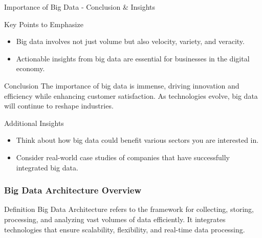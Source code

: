 \documentclass[aspectratio=169]{beamer}
\begin{document}
\begin{frame}[fragile]{Importance of Big Data - Conclusion & Insights}
  \begin{block}{Key Points to Emphasize}
    \begin{itemize}
      \item Big data involves not just volume but also velocity, variety, and veracity.
      \item Actionable insights from big data are essential for businesses in the digital economy.
    \end{itemize}
  \end{block}
  
  \begin{block}{Conclusion}
    The importance of big data is immense, driving innovation and efficiency while enhancing customer satisfaction. As technologies evolve, big data will continue to reshape industries.
  \end{block}
  
  \begin{block}{Additional Insights}
    \begin{itemize}
      \item Think about how big data could benefit various sectors you are interested in.
      \item Consider real-world case studies of companies that have successfully integrated big data.
    \end{itemize}
  \end{block}
\end{frame}

\begin{frame}[fragile]
    \frametitle{Big Data Architecture Overview}
    \begin{block}{Definition}
        Big Data Architecture refers to the framework for collecting, storing, processing, and analyzing vast volumes of data efficiently. It integrates technologies that ensure scalability, flexibility, and real-time data processing.
    \end{block}
\end{frame}
\end{document}
